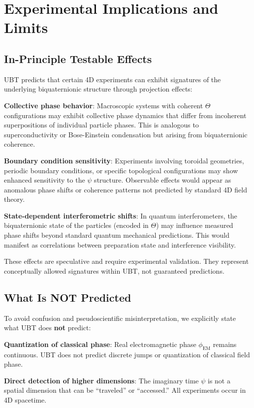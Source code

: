 \documentclass[12pt]{article}
\begin{document}
\section{Experimental Implications and Limits}

\subsection{In-Principle Testable Effects}

UBT predicts that certain 4D experiments can exhibit signatures of the underlying biquaternionic structure through projection effects:

\textbf{Collective phase behavior}: Macroscopic systems with coherent $\Theta$ configurations may exhibit collective phase dynamics that differ from incoherent superpositions of individual particle phases. This is analogous to superconductivity or Bose-Einstein condensation but arising from biquaternionic coherence.

\textbf{Boundary condition sensitivity}: Experiments involving toroidal geometries, periodic boundary conditions, or specific topological configurations may show enhanced sensitivity to the $\psi$ structure. Observable effects would appear as anomalous phase shifts or coherence patterns not predicted by standard 4D field theory.

\textbf{State-dependent interferometric shifts}: In quantum interferometers, the biquaternionic state of the particles (encoded in $\Theta$) may influence measured phase shifts beyond standard quantum mechanical predictions. This would manifest as correlations between preparation state and interference visibility.

These effects are speculative and require experimental validation. They represent conceptually allowed signatures within UBT, not guaranteed predictions.

\subsection{What Is NOT Predicted}

To avoid confusion and pseudoscientific misinterpretation, we explicitly state what UBT does \textbf{not} predict:

\textbf{Quantization of classical phase}: Real electromagnetic phase $\phi_{\text{EM}}$ remains continuous. UBT does not predict discrete jumps or quantization of classical field phase.

\textbf{Direct detection of higher dimensions}: The imaginary time $\psi$ is not a spatial dimension that can be ``traveled'' or ``accessed.'' All experiments occur in 4D spacetime.
\end{document}
